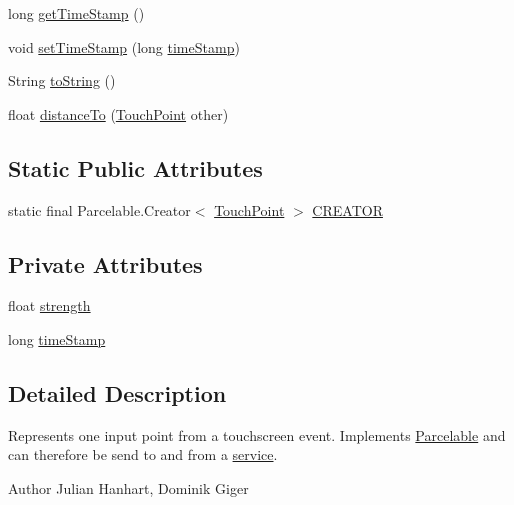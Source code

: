 \begin{DoxyCompactItemize}
long \hyperlink{classch_1_1zhaw_1_1ba10__bsha__1_1_1TouchPoint_aa25d5cf22375b6c5f8e59bccc2ec69d0}{getTimeStamp} ()
\item 
void \hyperlink{classch_1_1zhaw_1_1ba10__bsha__1_1_1TouchPoint_aae69659dd478457f14287116e34f868e}{setTimeStamp} (long \hyperlink{classch_1_1zhaw_1_1ba10__bsha__1_1_1TouchPoint_aa0b6bef79c301e7ef664dd21045b517d}{timeStamp})
\item 
String \hyperlink{classch_1_1zhaw_1_1ba10__bsha__1_1_1TouchPoint_a4e930068dfcb62f5ff8a7dd60ae2a04c}{toString} ()
\item 
float \hyperlink{classch_1_1zhaw_1_1ba10__bsha__1_1_1TouchPoint_afb4bcfacdc81a0922e69fcef9f07dbf8}{distanceTo} (\hyperlink{classch_1_1zhaw_1_1ba10__bsha__1_1_1TouchPoint}{TouchPoint} other)
\end{DoxyCompactItemize}
\subsection*{Static Public Attributes}
\begin{DoxyCompactItemize}
\item 
static final Parcelable.Creator$<$ \hyperlink{classch_1_1zhaw_1_1ba10__bsha__1_1_1TouchPoint}{TouchPoint} $>$ \hyperlink{classch_1_1zhaw_1_1ba10__bsha__1_1_1TouchPoint_a0f386eacc8abbc547cd2a5b23630d211}{CREATOR}
\end{DoxyCompactItemize}
\subsection*{Private Attributes}
\begin{DoxyCompactItemize}
\item 
float \hyperlink{classch_1_1zhaw_1_1ba10__bsha__1_1_1TouchPoint_ad245f48693fecee2b25f3c5e7e1976a8}{strength}
\item 
long \hyperlink{classch_1_1zhaw_1_1ba10__bsha__1_1_1TouchPoint_aa0b6bef79c301e7ef664dd21045b517d}{timeStamp}
\end{DoxyCompactItemize}


\subsection{Detailed Description}
Represents one input point from a touchscreen event. Implements \hyperlink{}{Parcelable} and can therefore be send to and from a \hyperlink{namespacech_1_1zhaw_1_1ba10__bsha__1_1_1service}{service}.

\begin{DoxyAuthor}{Author}
Julian Hanhart, Dominik Giger 
\end{DoxyAuthor}


